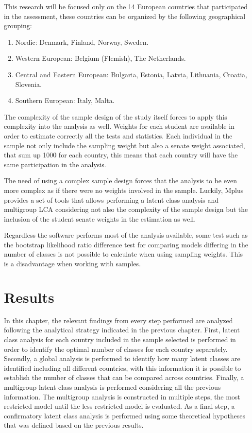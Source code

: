 \documentclass[12pt,a4paper,oneside]{reedthesis}
\providecommand{\tightlist}{%
  \setlength{\itemsep}{0pt}\setlength{\parskip}{0pt}}
\begin{document}
This research will be focused only on the 14 European countries that participated in the assessment, these countries can be organized by the following geographical grouping:
\begin{enumerate}
\def\labelenumi{\alph{enumi})}
\tightlist
\item
  Nordic: Denmark, Finland, Norway, Sweden.\\
\item
  Western European: Belgium (Flemish), The Netherlands.\\
\item
  Central and Eastern European: Bulgaria, Estonia, Latvia, Lithuania, Croatia, Slovenia.\\
\item
  Southern European: Italy, Malta.
\end{enumerate}
The complexity of the sample design of the study itself forces to apply this complexity into the analysis as well. Weights for each student are available in order to estimate correctly all the tests and statistics. Each individual in the sample not only include the sampling weight but also a senate weight associated, that sum up 1000 for each country, this means that each country will have the same participation in the analysis.

The need of using a complex sample design forces that the analysis to be even more complex as if there were no weights involved in the sample. Luckily, Mplus provides a set of tools that allows performing a latent class analysis and multigroup LCA considering not also the complexity of the sample design but the inclusion of the student senate weights in the estimation as well.

Regardless the software performs most of the analysis available, some test such as the bootstrap likelihood ratio difference test for comparing models differing in the number of classes is not possible to calculate when using sampling weights. This is a disadvantage when working with samples.

\clearpage

\hypertarget{results}{%
\chapter{Results}\label{results}}

In this chapter, the relevant findings from every step performed are analyzed following the analytical strategy indicated in the previous chapter. First, latent class analysis for each country included in the sample selected is performed in order to identify the optimal number of classes for each country separately. Secondly, a global analysis is performed to identify how many latent classes are identified including all different countries, with this information it is possible to establish the number of classes that can be compared across countries. Finally, a multigroup latent class analysis is performed considering all the previous information. The multigroup analysis is constructed in multiple steps, the most restricted model until the less restricted model is evaluated. As a final step, a confirmatory latent class analysis is performed using some theoretical hypotheses that was defined based on the previous results.
\end{document}

